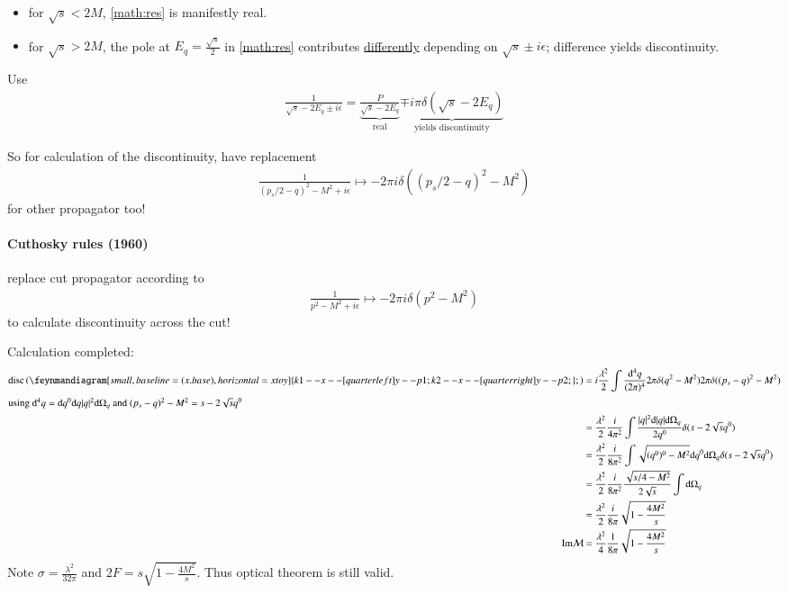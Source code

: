 \begin{itemize}
	\item for $\sqrt{s} < 2M$, \ref{math:res} is manifestly real.
	\item for $\sqrt{s} > 2M$, the pole at $E_q = \frac{\sqrt{s}}{2}$ in \ref{math:res} contributes \underline{differently} depending on $\sqrt{s}\pm i\epsilon$; difference yields discontinuity.
\end{itemize}
Use
\begin{align*}
	\frac{1}{\sqrt{s}-2E_q\pm i\epsilon} = \underbrace{\frac{P}{\sqrt{s} - 2 E_q}}_{\text{real}} \underbrace{\mp i\pi \delta(\sqrt{s} - 2 E_q)}_{\text{yields discontinuity}}
\end{align*}

So for calculation of the discontinuity, have replacement 
\begin{align*}
	\frac{1}{(p_s/2 - q)^2 - M^2 + i\epsilon} \longmapsto -2\pi i \delta((p_s/2 -q)^2 - M^2)
\end{align*}
for other propagator too!

\paragraph{Cuthosky rules (1960)} replace cut propagator according to 
\begin{align}
	\frac{1}{p^2 - M^2 + i\epsilon} \longmapsto -2\pi  i \delta(p^2 - M^2)
\end{align}
to calculate discontinuity across the cut!

Calculation completed:
\begin{align*}
	\text{disc} \left(	
		\feynmandiagram[small, baseline=(x.base), horizontal=x to y]{
			k1 -- x --[quarter left] y -- p1;
			k2 -- x --[quarter right] y -- p2;
		};
	\right )
	 &= i\frac{\lambda^2}{2} \int \frac{\dd^4 q}{(2\pi)^4} 2\pi \delta(q^2 - M^2) 2\pi \delta((p_s - q)^2 - M^2) \\
	 \shortintertext{using $\dd^4 q = \dd q^0 \dd q |q|^2 \dd \Omega_q$ and $(p_s - q)^2 - M^2 = s - 2\sqrt{s}q^0$}
	 &= \frac{\lambda^2}{2} \frac{i}{4\pi^2} \int \frac{|q|^2 \dd |q| \dd \Omega_q}{2q^0} \delta(s - 2\sqrt{s}q^0) \\
	 &= \frac{\lambda^2}{2} \frac{i}{8\pi^2} \int \sqrt{(q^0)^0 - M^2} \dd q^0 \dd \Omega_q \delta(s - 2\sqrt{s}q^0) \\
	 &= \frac{\lambda^2}{2} \frac{i}{8\pi^2} \frac{\sqrt{s/4 - M^2}}{2\sqrt{s}} \int \dd \Omega_q \\
	 &= \frac{\lambda^2}{2} \frac{i}{8\pi} \sqrt{1 - \frac{4M^2}{s}} \\
	\text{Im}\M &= \frac{\lambda^2}{4} \frac{1}{8\pi} \sqrt{1 - \frac{4M^2}{s}}
\end{align*}
Note $\sigma = \frac{\lambda^2}{32\pi}$ and $2F = s \sqrt{1-\frac{4M^2}{s}}$. Thus optical theorem is still valid.

